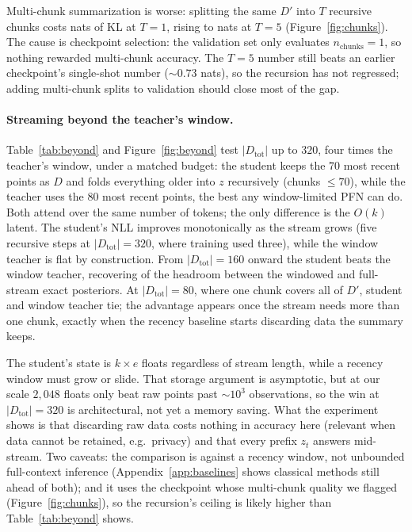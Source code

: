 \documentclass{article}
\newcommand{\Dtot}{D_{\mathrm{tot}}}
\newcommand{\Dfar}{D'}
\newcommand{\Dloc}{D}
\begin{document}
Multi-chunk summarization is worse: splitting the same $\Dfar$ into $T$
recursive chunks costs \chunkonekl{} nats of KL at $T=1$, rising to
\chunkfivekl{} nats at $T=5$ (Figure~\ref{fig:chunks}). The cause is checkpoint
selection: the validation set only evaluates $n_{\mathrm{chunks}}=1$, so nothing
rewarded multi-chunk accuracy. The $T=5$ number still beats an earlier
checkpoint's single-shot number ($\sim 0.73$ nats), so the recursion has not
regressed; adding multi-chunk splits to validation should close most of the gap.

\begin{table}[htbp]
\centering
\caption{Predictive quality vs.\ size of the direct context $\Dloc$
($|\Dtot| = 80$ fixed, $3{,}200$ data sets, $40$ query points each). Left: NLL
of held-out targets (nats, lower is better). Right: KL from teacher-full
(nats/point).}
\label{tab:sweep}
\resizebox{\textwidth}{!}{}
\end{table}

\paragraph{Streaming beyond the teacher's window.} Table~\ref{tab:beyond} and
Figure~\ref{fig:beyond} test $|\Dtot|$ up to $320$, four times the teacher's
window, under a matched budget: the student keeps the $70$ most recent points as
$\Dloc$ and folds everything older into $z$ recursively (chunks $\le 70$), while
the teacher uses the $80$ most recent points, the best any window-limited PFN
can do. Both attend over the same number of tokens; the only difference is the
$O(k)$ latent. The student's NLL improves monotonically as the stream grows
(five recursive steps at $|\Dtot|=320$, where training used three), while the
window teacher is flat by construction. From $|\Dtot|=160$ onward the student
beats the window teacher, recovering \beyondgainpct{} of the headroom between
the windowed and full-stream exact posteriors. At $|\Dtot|=80$, where one chunk
covers all of $\Dfar$, student and window teacher tie; the advantage appears
once the stream needs more than one chunk, exactly when the recency baseline
starts discarding data the summary keeps.

The student's state is $k \times e$ floats regardless of stream length, while a
recency window must grow or slide. That storage argument is asymptotic, but at our
scale $2{,}048$ floats only beat raw points past $\sim\!10^3$ observations, so
the win at $|\Dtot|=320$ is architectural, not yet a memory saving. What the
experiment shows is that discarding raw data costs nothing in accuracy here
(relevant when data cannot be retained, e.g.\ privacy) and that every prefix
$z_t$ answers mid-stream. Two caveats: the comparison is against a recency
window, not unbounded full-context inference (Appendix~\ref{app:baselines} shows
classical methods still ahead of both); and it uses the checkpoint whose
multi-chunk quality we flagged (Figure~\ref{fig:chunks}), so the recursion's
ceiling is likely higher than Table~\ref{tab:beyond} shows.
\end{document}
